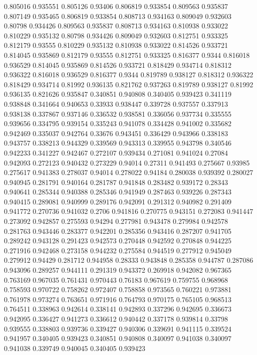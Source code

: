 0.805016 0.935551
0.805126 0.93406
0.806819 0.933854
0.809563 0.935837
0.807149 0.935465
0.806819 0.933854
0.808713 0.934163
0.809049 0.932603
0.80798 0.934426
0.809563 0.935837
0.808713 0.934163
0.810938 0.933022
0.810229 0.935132
0.80798 0.934426
0.809049 0.932603
0.812751 0.933325
0.812179 0.93555
0.810229 0.935132
0.810938 0.933022
0.814526 0.933721
0.814045 0.935869
0.812179 0.93555
0.812751 0.933325
0.816377 0.9344
0.816018 0.936529
0.814045 0.935869
0.814526 0.933721
0.818429 0.934714
0.818312 0.936322
0.816018 0.936529
0.816377 0.9344
0.819789 0.938127
0.818312 0.936322
0.818429 0.934714
0.81992 0.936135
0.821762 0.937263
0.819789 0.938127
0.81992 0.936135
0.821626 0.935847
0.340851 0.940808
0.340405 0.939423
0.341119 0.938848
0.341664 0.940653
0.33933 0.938447
0.339728 0.937557
0.337913 0.938138
0.337867 0.937146
0.336532 0.938581
0.336056 0.937734
0.335555 0.939656
0.334795 0.939154
0.335243 0.941078
0.334428 0.941002
0.335682 0.942469
0.335037 0.942764
0.33676 0.943451
0.336429 0.943966
0.338183 0.943757
0.338213 0.944329
0.339569 0.943313
0.339955 0.943798
0.340546 0.942233
0.341227 0.942467
0.272107 0.939434
0.271081 0.941024
0.27084 0.942093
0.272123 0.940432
0.273229 0.94014
0.27311 0.941493
0.275667 0.93985
0.275617 0.941383
0.278037 0.94014
0.278022 0.94184
0.280038 0.939392
0.280027 0.940945
0.281791 0.940164
0.281787 0.941848
0.283482 0.939172
0.28343 0.940641
0.285344 0.940388
0.285346 0.941949
0.287463 0.939226
0.287343 0.940415
0.289081 0.940999
0.289176 0.942091
0.291312 0.940982
0.291409 0.941772
0.270736 0.941032
0.2706 0.941816
0.270775 0.943151
0.272083 0.941447
0.273092 0.942857
0.275593 0.94294
0.277981 0.943478
0.279984 0.942578
0.281763 0.943446
0.283377 0.942201
0.285356 0.943416
0.287207 0.941705
0.289242 0.943128
0.291423 0.942573
0.270448 0.942592
0.270848 0.944225
0.271916 0.942468
0.273158 0.944232
0.275584 0.944519
0.277912 0.945049
0.279912 0.94429
0.281712 0.944958
0.28333 0.943848
0.285358 0.944787
0.287086 0.943096
0.289257 0.944111
0.291319 0.943372
0.269918 0.942082
0.967365 0.763169
0.967035 0.761431
0.970443 0.76183
0.967619 0.759755
0.968968 0.758593
0.970722 0.758262
0.972407 0.758858
0.973565 0.760221
0.973881 0.761978
0.973274 0.763651
0.971916 0.764793
0.970175 0.765105
0.968513 0.764511
0.338963 0.942614
0.338141 0.942893
0.337296 0.942695
0.336673 0.942095
0.336427 0.941273
0.336612 0.940442
0.337178 0.939814
0.33798 0.939555
0.338803 0.939736
0.339427 0.940306
0.339691 0.941115
0.339524 0.941957
0.340405 0.939423
0.340851 0.940808
0.340097 0.941038
0.340097 0.941038
0.339749 0.940045
0.340405 0.939423

